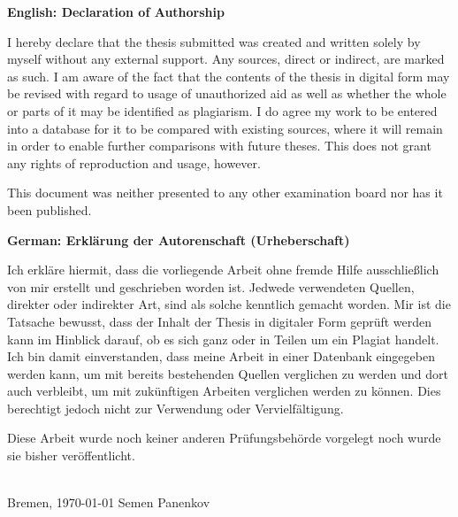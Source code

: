 \documentclass[14pt]{constructor-thesis}
\theoremstyle{definition}
\begin{document}
\begin{small}

{\noindent \normalsize \textbf{English: Declaration of Authorship}}

I hereby declare that the thesis submitted was created and written
solely by myself without any external support. Any sources, direct
or indirect, are marked as such. I am aware of the fact that the
contents of the thesis in digital form may be revised with regard to
usage of unauthorized aid as well as whether the whole or parts of
it may be identified as plagiarism. I do agree my work to be entered
into a database for it to be compared with existing sources, where
it will remain in order to enable further comparisons with future
theses. This does not grant any rights of reproduction and usage,
however.

This document was neither presented to any other examination board
nor has it been published.

\vspace*{3em}

{\noindent \normalsize \textbf{German: Erklärung der Autorenschaft (Urheberschaft)}}

Ich erkläre hiermit, dass die vorliegende Arbeit ohne fremde Hilfe
ausschließlich von mir erstellt und geschrieben worden ist. Jedwede
verwendeten Quellen, direkter oder indirekter Art, sind als solche
kenntlich gemacht worden. Mir ist die Tatsache bewusst, dass der
Inhalt der Thesis in digitaler Form geprüft werden kann im Hinblick
darauf, ob es sich ganz oder in Teilen um ein Plagiat handelt. Ich
bin damit einverstanden, dass meine Arbeit in einer Datenbank
eingegeben werden kann, um mit bereits bestehenden Quellen
verglichen zu werden und dort auch verbleibt, um mit zukünftigen
Arbeiten verglichen werden zu können. Dies berechtigt jedoch nicht
zur Verwendung oder Vervielfältigung.

Diese Arbeit wurde noch keiner anderen Prüfungsbehörde vorgelegt
noch wurde sie bisher veröffentlicht.

\end{small}

\vspace{2em}

\noindent \dotfill \\
Bremen, \today{} \hfill Semen Panenkov
\end{document}
